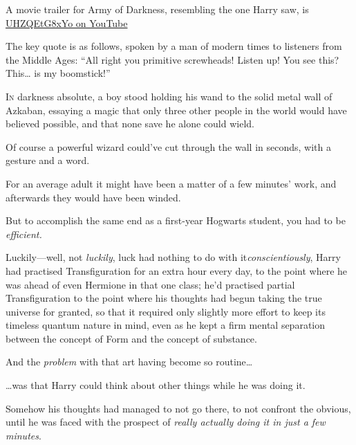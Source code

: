 
\begin{chapterOpeningAuthorNote}
A movie trailer for Army of Darkness, resembling the one Harry saw, is \href{https://www.youtube.com/watch?v=UHZQEtG8xYo}{UHZQEtG8xYo on YouTube} 

The key quote is as follows, spoken by a man of modern times to listeners from the Middle Ages:
“All right you primitive screwheads! Listen up! You see this? This… is my boomstick!”
\end{chapterOpeningAuthorNote}



\lettrine{I}{n} darkness absolute, a boy stood holding his wand to the solid metal wall of Azkaban, essaying a magic that only three other people in the world would have believed possible, and that none save he alone could wield.

Of course a powerful wizard could’ve cut through the wall in seconds, with a gesture and a word.

For an average adult it might have been a matter of a few minutes’ work, and afterwards they would have been winded.

But to accomplish the same end as a first-year Hogwarts student, you had to be \emph{efficient.}

Luckily—well, not \emph{luckily}, luck had nothing to do with
it\emdashhyp\emph{conscientiously}, Harry had practised Transfiguration for an extra hour every day, to the point where he was ahead of even Hermione in that one class; he’d practised partial Transfiguration to the point where his thoughts had begun taking the true universe for granted, so that it required only slightly more effort to keep its timeless quantum nature in mind, even as he kept a firm mental separation between the concept of Form and the concept of substance.

And the \emph{problem} with that art having become so routine…

…was that Harry could think about other things while he was doing it.

Somehow his thoughts had managed to not go there, to not confront the obvious, until he was faced with the prospect of \emph{really actually doing it in just a few minutes}.

